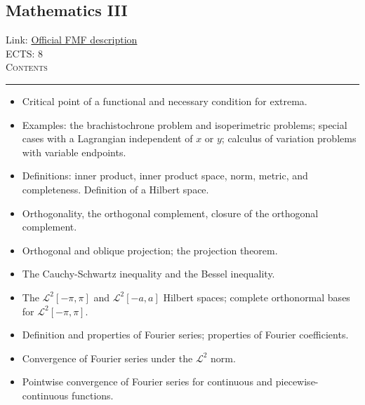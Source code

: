 \documentclass[11pt, a4paper]{article}
\newenvironment{course}[3]{
\subsection{#1}%
Link: \href{#2}{Official FMF description}\\%
ECTS: #3%
\vspace{1ex}
\\
{\large \textsc{Contents}}\\[-0.9ex]%
\rule{\textwidth}{0.5pt}
\vspace{-3ex}
}
{}
\newenvironment{chapter}[1]{
\begin{tcolorbox}[title=#1, breakable]
}
{\end{tcolorbox}}
\begin{document}
\begin{course}{Mathematics III}{https://www.fmf.uni-lj.si/en/study-physics/programmes/1fiz/2020/7000777/courses/522/}{8}
\begin{chapter}{Calculus of variations}
\begin{itemize}
                \item Critical point of a functional and necessary condition for extrema.

                \item Examples: the brachistochrone problem and isoperimetric problems; special cases with a Lagrangian independent of $ x $ or $ y $; calculus of variation problems with variable endpoints.

                
            \end{itemize}
        \end{chapter}

        \begin{chapter}{Introduction to Hilbert spaces}
            \begin{itemize}
            
                \item Definitions: inner product, inner product space, norm, metric, and completeness.
                Definition of a Hilbert space.

                \item Orthogonality, the orthogonal complement, closure of the orthogonal complement.

                \item Orthogonal and oblique projection; the projection theorem.

                \item The Cauchy-Schwartz inequality and the Bessel inequality.

            \end{itemize}

        \end{chapter}

        \begin{chapter}{Introduction to Fourier series}
            \begin{itemize}
            
                \item The $ \mathcal{L}^{2}[-\pi, \pi] $ and $ \mathcal{L}^{2}[-a, a] $ Hilbert spaces; complete orthonormal bases for $ \mathcal{L}^{2}[-\pi, \pi] $.

                \item Definition and properties of Fourier series; properties of Fourier coefficients.

                \item Convergence of Fourier series under the $ \mathcal{L}^{2} $ norm.

                \item Pointwise convergence of Fourier series for continuous and piecewise-continuous functions.
            \end{itemize}
        \end{chapter}
\end{course}
\end{document}
